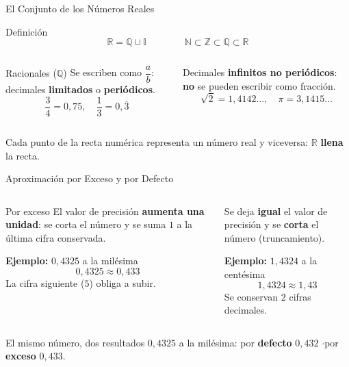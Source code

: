 \documentclass[aspectratio=169]{beamer}
\begin{document}
\begin{frame}{El Conjunto de los Números Reales}
  \begin{block}{Definición}
    \[
      \mathbb{R} = \mathbb{Q} \cup \mathbb{I}
      \qquad\qquad
      \mathbb{N} \subset \mathbb{Z} \subset \mathbb{Q} \subset \mathbb{R}
    \]
  \end{block}
  \vspace{2pt}
  \begin{columns}[T]
    \begin{exampleblock}{Racionales ($\mathbb{Q}$)}
      Se escriben como $\dfrac{a}{b}$: decimales \textbf{limitados} o
      \textbf{periódicos}.
      \[
        \frac{3}{4} = 0{,}75, \quad
        \frac{1}{3} = 0{,}\overline{3}
      \]
    \end{exampleblock}
    \begin{mwextra}
      Decimales \textbf{infinitos no periódicos}: \textbf{no} se
      pueden escribir como fracción.
      \[
        \sqrt{2} = 1{,}4142\dots, \quad
        \pi = 3{,}1415\dots
      \]
    \end{mwextra}
  \end{columns}
  \vspace{2pt}
  \begin{mwpasos}
    Cada punto de la recta numérica representa un número real y
    viceversa: $\mathbb{R}$ \textbf{llena} la recta.
  \end{mwpasos}
\end{frame}

\begin{frame}{Aproximación por Exceso y por Defecto}
  \begin{columns}[T]
    \begin{block}{Por exceso}
      El valor de precisión \textbf{aumenta una unidad}: se corta el
      número y se suma $1$ a la última cifra conservada.
      \vspace{2pt}

      \textbf{Ejemplo:} $0{,}4325$ a la milésima
      \[
        0{,}4325 \approx 0{,}433
      \]
      La cifra siguiente ($5$) obliga a subir.
    \end{block}
    \begin{mwextra}
      Se deja \textbf{igual} el valor de precisión y se \textbf{corta}
      el número (truncamiento).
      \vspace{2pt}

      \textbf{Ejemplo:} $1{,}4324$ a la centésima
      \[
        1{,}4324 \approx 1{,}43
      \]
      Se conservan $2$ cifras decimales.
    \end{mwextra}
  \end{columns}
  \begin{alertblock}{El mismo número, dos resultados}
    $0{,}4325$ a la milésima: por \textbf{defecto} $0{,}432$
    \quad$\cdot$\quad por \textbf{exceso} $0{,}433$.
  \end{alertblock}
\end{frame}
\end{document}
